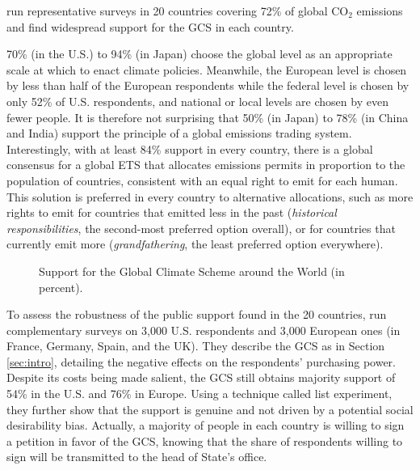\documentclass[12pt,english]{article}
\begin{document}
\citet{fabre_international_2023} run representative surveys in 20 countries covering 72\% of global CO$_\text{2}$ emissions and find widespread support for the GCS in each country. 

70\% (in the U.S.) to 94\% (in Japan) choose the global level as an appropriate scale at which to enact climate policies. Meanwhile, the European level is chosen by less than half of the European respondents while the federal level is chosen by only 52\% of U.S. respondents, and national or local levels are chosen by even fewer people. It is therefore not surprising that 50\% (in Japan) to 78\% (in China and India) %
support the principle of a global emissions trading system. 
Interestingly, with at least 84\% support in every country, %
there is a global consensus for a global ETS that allocates emissions permits in proportion to the population of countries, consistent with an equal right to emit for each human. This solution is preferred in every country to alternative allocations, such as more rights to emit for countries that emitted less in the past (\textit{historical responsibilities}, the second-most preferred option overall), or for countries that currently emit more (\textit{grandfathering}, the least preferred option everywhere). 

\begin{figure}[h!] %
    \caption{Support for the Global Climate Scheme around the World (in percent).}\label{fig:support}
\end{figure}

To assess the robustness of the public support found in the 20 countries, \citet{fabre_international_2023} run complementary surveys on 3,000 U.S. respondents and 3,000 European ones (in France, Germany, Spain, and the UK). They describe the GCS as in Section \ref{sec:intro}, detailing the negative effects on the respondents' purchasing power. Despite its costs being made salient, the GCS still obtains majority support of 54\% in the U.S. and 76\% in Europe. Using a technique called list experiment, they further show that the support is genuine and not driven by a potential social desirability bias. Actually, a majority of people in each country is willing to sign a petition in favor of the GCS, knowing that the share of respondents willing to sign will be transmitted to the head of State's office. 
\end{document}
